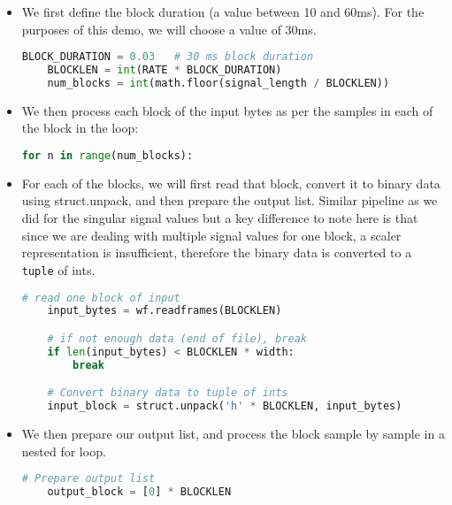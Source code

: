\documentclass[11pt]{article}
\begin{document}
\begin{itemize}
    \item We first define the block duration (a value between 10 and 60ms). For the purposes of this demo, we will choose a value of 30ms. 
    
    \begin{lstlisting}[language=python, label={lst:code}, breaklines=true, ]
    BLOCK_DURATION = 0.03   # 30 ms block duration
    BLOCKLEN = int(RATE * BLOCK_DURATION)
    num_blocks = int(math.floor(signal_length / BLOCKLEN))
    \end{lstlisting}    
    
    \item We then process each block of the input bytes as per the samples in each of the block in the loop:
    
    \begin{lstlisting}[language=python, label={lst:code}, breaklines=true, ]
    for n in range(num_blocks):
    \end{lstlisting}    

    \item For each of the blocks, we will first read that block, convert it to binary data using struct.unpack, and then prepare the output list. Similar pipeline as we did for the singular signal values but a key difference to note here is that since we are dealing with multiple signal values for one block, a scaler representation is insufficient, therefore the binary data is converted to a \texttt{tuple} of ints.
    
    \begin{lstlisting}[language=python, label={lst:code}, breaklines=true, ]
    # read one block of input 
    input_bytes = wf.readframes(BLOCKLEN)

    # if not enough data (end of file), break
    if len(input_bytes) < BLOCKLEN * width:
        break

    # Convert binary data to tuple of ints
    input_block = struct.unpack('h' * BLOCKLEN, input_bytes)
    \end{lstlisting}    

    \item We then prepare our output list, and process the block sample by sample in a nested for loop.
    
    \begin{lstlisting}[language=python, label={lst:code}, breaklines=true, ]
    # Prepare output list
    output_block = [0] * BLOCKLEN


\end{lstlisting}
\end{itemize}
\end{document}
